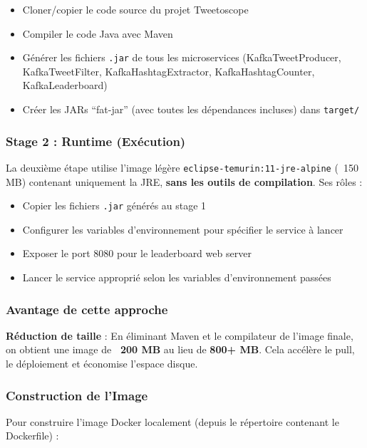 \documentclass[10pt,a4paper]{article}
\begin{document}
\begin{itemize}
    \item Cloner/copier le code source du projet Tweetoscope
    \item Compiler le code Java avec Maven
    \item Générer les fichiers \texttt{.jar} de tous les microservices (KafkaTweetProducer, KafkaTweetFilter, KafkaHashtagExtractor, KafkaHashtagCounter, KafkaLeaderboard)
    \item Créer les JARs ``fat-jar'' (avec toutes les dépendances incluses) dans \texttt{target/}
\end{itemize}

\subsubsection{Stage 2 : Runtime (Exécution)}

La deuxième étape utilise l'image légère \texttt{eclipse-temurin:11-jre-alpine} (~150 MB) contenant uniquement la JRE, \textbf{sans les outils de compilation}. Ses rôles :

\begin{itemize}
    \item Copier les fichiers \texttt{.jar} générés au stage 1
    \item Configurer les variables d'environnement pour spécifier le service à lancer
    \item Exposer le port 8080 pour le leaderboard web server
    \item Lancer le service approprié selon les variables d'environnement passées
\end{itemize}

\subsubsection{Avantage de cette approche}

\textbf{Réduction de taille} : En éliminant Maven et le compilateur de l'image finale, on obtient une image de \textbf{~200 MB} au lieu de \textbf{800+ MB}. Cela accélère le pull, le déploiement et économise l'espace disque.

\subsubsection{Construction de l'Image}

Pour construire l'image Docker localement (depuis le répertoire contenant le Dockerfile) :
\end{document}

